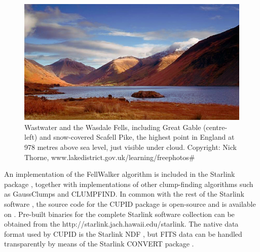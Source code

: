 \documentclass[final,authoryear,5p,times,twocolumn]{elsarticle}
\begin{document}
\begin{figure}
\includegraphics[width=\columnwidth]{wasdale}
\caption{Wastwater and the Wasdale Fells, including Great Gable
(centre-left) and snow-covered Scafell Pike, the highest point in England
at 978 metres above sea level, just visible under cloud. Copyright: Nick
Thorne, www.lakedistrict.gov.uk/learning/freephotos\# }
\label{fig:wasdale}
\end{figure}

An implementation of the FellWalker algorithm is included in the Starlink
package \citep[][]{CupidAdass,SUN255}, together with
implementations of other clump-finding algorithms such as GaussClumps
\citep[][]{1990ApJ...356..513S} and CLUMPFIND. In common
with the rest of the Starlink software
\citep[][]{StarlinkAdass}, the source code for the CUPID
package is open-source and is available on
. Pre-built
binaries for the complete Starlink software collection can be obtained
from the 
{http://starlink.jach.hawaii.edu/starlink}. The native data format used
by CUPID is the Starlink NDF \citep{2014Jenness}, but FITS data can be handled
transparently by means of the Starlink CONVERT package \citep{SUN55}.
\end{document}
